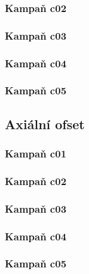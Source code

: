 \documentclass[a4paper,twoside,11pt]{article}
\begin{document}


\subsubsection{Kampaň c02}



\subsubsection{Kampaň c03}



\subsubsection{Kampaň c04}



\subsubsection{Kampaň c05}



\subsection{Axiální ofset}
\subsubsection{Kampaň c01}



\subsubsection{Kampaň c02}



\subsubsection{Kampaň c03}



\subsubsection{Kampaň c04}



\subsubsection{Kampaň c05}




    
\end{document}
